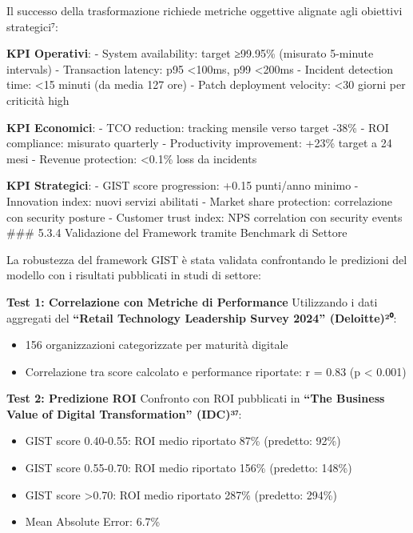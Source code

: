 \documentclass{report}
\begin{document}
Il successo della trasformazione richiede metriche oggettive alignate
agli obiettivi strategici⁷:

\textbf{KPI Operativi}: - System availability: target ≥99.95\% (misurato
5-minute intervals) - Transaction latency: p95 \textless100ms, p99
\textless200ms - Incident detection time: \textless15 minuti (da media
127 ore) - Patch deployment velocity: \textless30 giorni per criticità
high

\textbf{KPI Economici}: - TCO reduction: tracking mensile verso target
-38\% - ROI compliance: misurato quarterly - Productivity improvement:
+23\% target a 24 mesi - Revenue protection: \textless0.1\% loss da
incidents

\textbf{KPI Strategici}: - GIST score progression: +0.15 punti/anno
minimo - Innovation index: nuovi servizi abilitati - Market share
protection: correlazione con security posture - Customer trust index:
NPS correlation con security events \#\#\# 5.3.4 Validazione del
Framework tramite Benchmark di Settore

La robustezza del framework GIST è stata validata confrontando le
predizioni del modello con i risultati pubblicati in studi di settore:

\textbf{Test 1: Correlazione con Metriche di Performance} Utilizzando i
dati aggregati del \textbf{``Retail Technology Leadership Survey 2024''
(Deloitte)²⁰}:

\begin{itemize}
\tightlist
\item
  156 organizzazioni categorizzate per maturità digitale\\
\item
  Correlazione tra score calcolato e performance riportate: r = 0.83 (p
  \textless{} 0.001)
\end{itemize}

\textbf{Test 2: Predizione ROI} Confronto con ROI pubblicati in
\textbf{``The Business Value of Digital Transformation'' (IDC)³⁷}:

\begin{itemize}
\tightlist
\item
  GIST score 0.40-0.55: ROI medio riportato 87\% (predetto: 92\%)\\
\item
  GIST score 0.55-0.70: ROI medio riportato 156\% (predetto: 148\%)\\
\item
  GIST score \textgreater0.70: ROI medio riportato 287\% (predetto:
  294\%)\\
\item
  Mean Absolute Error: 6.7\%
\end{itemize}
\end{document}
